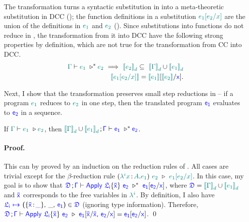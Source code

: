 The transformation turns a syntactic substitution in {\ccs} into a meta-theoretic substitution in DCC (); the function definitions in a substitution $\color{teal}{e_1[e_2\slash x]}\color{black}$ are the union of the definitions in $\color{teal}{e_1}\color{black}$ and $\color{teal}{e_2}\color{black}$ (). 
Since substitutions into functions do not reduce in {\ccs}, the transformation from it into DCC have the following strong properties by definition, which are not true for the transformation from CC into DCC.
\begin{align}
	\helper{\Gamma} \vdash \helper{e_1}\ \triangleright^* \helper{e_2}\ \Longrightarrow\ \helper{\bbracket{e_2}_d} \subseteq\ \helper{\bbracket{\Gamma}_d} \cup \helper{\bbracket{e_1}_d}
	\label{reduction def}\\
	\hbracket{\helper{e_1\sub{e_2}{x}}} = \hbracket{\helper{e_1}}\sub{\hbracket{\helper{e_2}}}{\target{x}}.
	\label{ccs substitution}
\end{align}

Next, I show that the transformation preserves small step reductions in {\ccs} -- if a {\ccs} program $\color{teal}{e_1}\color{black}$ reduces to $\color{teal}{e_2}\color{black}$ in one step, then the translated program $\target{e_1}$ evaluates to $\target{e_2}$ in a sequence.
\begin{lemma} If $\helper{\Gamma} \vdash \helper{e_1}\ \triangleright \helper{e_2}$, then
$\helper{\bbracket{\Gamma}_d} \cup \helper{\bbracket{e_1}_d} \semicolon \target{\Gamma} \vdash \target{e_1}\ \triangleright^* \target{e_2}$.
\paragraph{Proof.} This can by proved by an induction on the reduction rules of {\ccs}. All cases are trivial except for the $\beta$-reduction rule 
$(\helper{\lambda^i x} \goodcolon \helper{A} . \helper{e_1})\ \helper{e_2}\ \triangleright\ \helper{e_1\sub{e_2}{x}}$.
In this case, my goal is to show that 
$\target{\fdef} \semicolon \target{\Gamma} \vdash
\target{Apply}\ \targetlab{\flabel_i}{\bar{x}}\ \target{e_2}\ \triangleright^* \ \target{e_1}\targetsub{e_2}{x}$, where
$\target{\fdef} = \helper{\bbracket{\Gamma}_d} \cup \helper{\bbracket{e_1}_d}$ and $\target{\bar{x}}$ corresponds to the free variables in $\color{teal}{\lambda^i}\color{black}$. By definition, I also have
$\itemdef{\target{\flabel_i}}{\itemtype{\bar{x}}{\_}}{\_}{\target{e_1}} \in \target{\fdef}$ (ignoring type information).
Therefore, 
$\target{\fdef} \semicolon \target{\Gamma} \vdash
\target{Apply}\ \targetlab{\flabel_i}{\bar{x}}\ \target{e_2}\ \triangleright \ 
\target{e_1}[\target{\bar{x}}\slash\target{\bar{x}}\sfcomma\target{e_2}\slash\target{x}]
= \target{e_1}\targetsub{e_2}{x}
$. \qed
\end{lemma}

